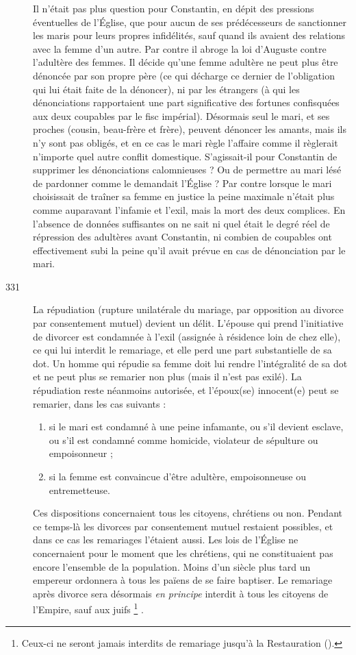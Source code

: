 \begin{description}
Il n'était pas plus question pour Constantin, en dépit des pressions éventuelles de l'Église, que pour aucun de ses prédécesseurs de sanctionner les maris pour leurs propres infidélités, sauf quand ils avaient des relations avec la femme d'un autre. Par contre il abroge la loi d'Auguste contre l'adultère des femmes. Il décide qu'une femme adultère ne peut plus être dénoncée par son propre père (ce qui décharge ce dernier de l'obligation qui lui était faite de la dénoncer), ni par les étrangers (à qui les dénonciations rapportaient une part significative des fortunes confisquées aux deux coupables par le fisc impérial). Désormais seul le mari, et ses proches (cousin, beau-frère et frère), peuvent dénoncer les amants, mais ils n'y sont pas obligés, et en ce cas le mari règle l'affaire comme il règlerait n'importe quel autre conflit domestique. S'agissait-il pour Constantin de supprimer les dénonciations calomnieuses ? Ou de permettre au mari lésé de pardonner comme le demandait l'Église ? Par contre lorsque le mari choisissait de traîner sa femme en justice la peine maximale n'était plus comme auparavant l'infamie et l'exil, mais la mort des deux complices. En l'absence de données suffisantes on ne sait ni quel était le degré réel de répression des adultères avant Constantin, ni combien de coupables ont effectivement subi la peine qu'il avait prévue en cas de dénonciation par le mari. 

\item[331] La répudiation (rupture unilatérale du mariage, par opposition au divorce par consentement mutuel) devient un délit. L'épouse qui prend l'initiative de divorcer est condamnée à l'exil (assignée à résidence loin de chez elle), ce qui lui interdit le remariage, et elle perd une part substantielle de sa dot. Un homme qui répudie sa femme doit lui rendre l'intégralité de sa dot et ne peut plus se remarier non plus (mais il n'est pas exilé). La répudiation reste néanmoins autorisée, et l'époux(se) innocent(e) peut se remarier, dans les cas suivants :
\begin{enumerate}[leftmargin=*,itemsep=0pt]
\item si le mari est condamné à une peine infamante, ou s'il devient esclave, ou s'il est condamné comme homicide, violateur de sépulture ou empoisonneur ;
\item si la femme est convaincue d'être adultère, empoisonneuse ou entremetteuse.
 \end{enumerate}
Ces dispositions concernaient tous les citoyens, chrétiens ou non. Pendant ce temps-là les divorces par consentement mutuel restaient possibles, et dans ce cas les remariages l'étaient aussi. Les lois de l'Église ne concernaient pour le moment que les chrétiens, qui ne constituaient pas encore l'ensemble de la population. Moins d'un siècle plus tard un empereur ordonnera à tous les païens de se faire baptiser. Le remariage après divorce sera désormais \emph{en principe} interdit à tous les citoyens de l'Empire, sauf aux juifs%
\footnote{Ceux-ci ne seront jamais interdits de remariage jusqu'à la Restauration ().}%
.


\end{description}
